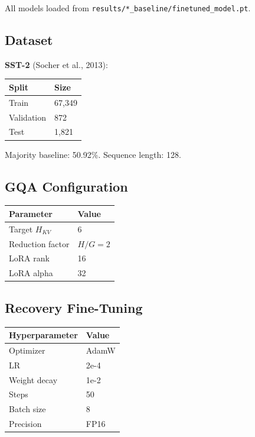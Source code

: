 All models loaded from \texttt{results/*\_baseline/finetuned\_model.pt}.

\subsection{Dataset}

\textbf{SST-2} (Socher et al., 2013):

\begin{table}[H]
\centering
\small
\begin{tabular}{ll}
\toprule
\textbf{Split} & \textbf{Size} \\
\midrule
Train & 67,349 \\
Validation & 872 \\
Test & 1,821 \\
\bottomrule
\end{tabular}
\end{table}

Majority baseline: 50.92\%. Sequence length: 128.

\subsection{GQA Configuration}

\begin{table}[H]
\centering
\small
\begin{tabular}{ll}
\toprule
\textbf{Parameter} & \textbf{Value} \\
\midrule
Target $H_{KV}$ & 6 \\
Reduction factor & $H / G = 2$ \\
LoRA rank & 16 \\
LoRA alpha & 32 \\
\bottomrule
\end{tabular}
\end{table}

\subsection{Recovery Fine-Tuning}

\begin{table}[H]
\centering
\small
\begin{tabular}{ll}
\toprule
\textbf{Hyperparameter} & \textbf{Value} \\
\midrule
Optimizer & AdamW \\
LR & 2e-4 \\
Weight decay & 1e-2 \\
Steps & 50 \\
Batch size & 8 \\
Precision & FP16 \\
\bottomrule
\end{tabular}
\end{table}

